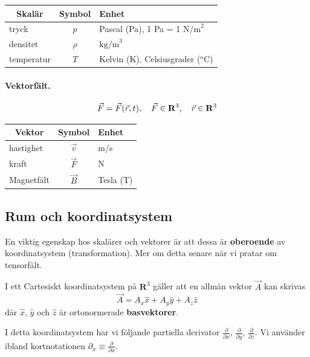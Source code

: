 \documentclass[%
oneside,                 %
final,                   %
10pt]{article}
\begin{document}
\begin{tabular}{lcl}
\hline
\multicolumn{1}{c}{ Skalär } & \multicolumn{1}{c}{ Symbol } & \multicolumn{1}{l}{ Enhet } \\
\hline
tryck      & $p$    & Pascal (Pa), 1 Pa = 1 $\mathrm{N/m}^2$              \\
densitet   & $\rho$ & $\mathrm{kg/m}^3$                                   \\
temperatur & $T$    & Kelvin (K), Celsiusgrader ($^\mathrm{o}\mathrm{C}$) \\
\hline
\end{tabular}


\noindent
\paragraph{Vektorfält.}
\begin{equation}
\vec{F} = \vec{F}(\vec{r},t), \quad \vec{F} \in \mathbf{R}^3,\quad \vec{r} \in \mathbf{R}^3 \\ 
\end{equation}



\begin{tabular}{lcl}
\hline
\multicolumn{1}{c}{ Vektor } & \multicolumn{1}{c}{ Symbol } & \multicolumn{1}{l}{ Enhet } \\
\hline
hastighet  & $\vec{v}$ & m/s       \\
kraft      & $\vec{F}$ & N         \\
Magnetfält & $\vec{B}$ & Tesla (T) \\
\hline
\end{tabular}


\noindent
\subsection{Rum och koordinatsystem}

En viktig egenskap hos skalärer och vektorer är att dessa är \textbf{oberoende} av koordinatsystem (transformation). Mer om detta senare när vi pratar om tensorfält.

I ett Cartesiskt koordinatsystem på $\mathbf{R}^3$ gäller att en allmän vektor $\vec{A}$ kan skrivas
\begin{equation}
\vec{A} = A_x \hat{x} + A_y \hat{y} + A_z \hat{z}
\end{equation}
där $\hat{x}$, $\hat{y}$ och $\hat{z}$ är ortonormerade \textbf{basvektorer}.

I detta koordinatsystem har vi följande partiella derivator $\frac{\partial}{\partial x}$, $\frac{\partial}{\partial y}$, $\frac{\partial}{\partial z}$. Vi använder ibland kortnotationen $\partial_x \equiv \frac{\partial}{\partial x}$.
\end{document}
